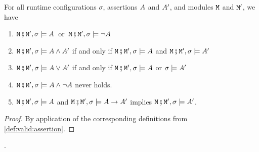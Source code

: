 \begin{lemma}
For all runtime configurations $\sigma$,    assertions $\A$ and $\A'$, and modules $\M$  and $\M'$, we have
\begin{enumerate}
\item
$\M\mkpair \M', \sigma \models \A$\ or\ $\M\mkpair \M', \sigma \models \neg\A$
\item
$\M\mkpair \M', \sigma  \models \A \wedge \A'$ \SP if and only if \SP $\M\mkpair \M', \sigma \models \A$ and $\M\mkpair \M', \sigma  \models \A'$
\item
$\M\mkpair \M', \sigma  \models \A \vee \A'$ \SP if and only if \SP $\M\mkpair \M', \sigma  \models \A$ or  $\sigma \models \A'$
\item
$\M\mkpair \M', \sigma  \models \A \wedge \neg\A$ never holds.
\item
$\M\mkpair \M', \sigma  \models \A$ and  $\M\mkpair \M', \sigma  \models \A \rightarrow \A'$  implies
$\M\mkpair \M', \sigma  \models \A '$.
\end{enumerate}
\end{lemma}
\begin{proof} By application of the corresponding definitions from \ref{def:valid:assertion}.\end{proof}.


